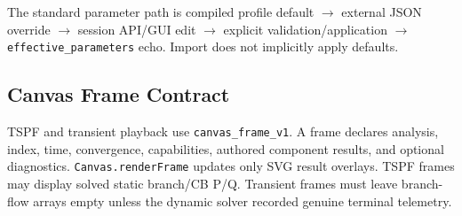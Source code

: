 The standard parameter path is compiled profile default \(\rightarrow\)
external JSON override \(\rightarrow\) session API/GUI edit \(\rightarrow\)
explicit validation/application \(\rightarrow\)
\texttt{effective\_parameters} echo. Import does not implicitly apply defaults.

\subsection{Canvas Frame Contract}

TSPF and transient playback use \texttt{canvas\_frame\_v1}.  A frame declares
analysis, index, time, convergence, capabilities, authored component results,
and optional diagnostics.  \texttt{Canvas.renderFrame} updates only SVG result
overlays. TSPF frames may display solved static branch/CB P/Q. Transient frames
must leave branch-flow arrays empty unless the dynamic solver recorded genuine
terminal telemetry.

